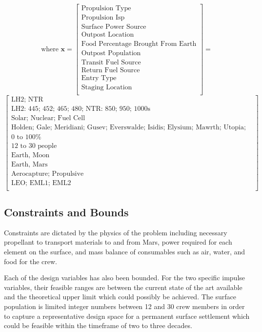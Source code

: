 \documentclass[]{aiaa-pretty}
\begin{document}
\begin{equation*}
\mbox{where } \mathbf{x}
=
\begin{bmatrix}
\mbox{Propulsion Type}\\
\mbox{Propulsion Isp}\\
\mbox{Surface Power Source}\\
\mbox{Outpost Location}\\
\mbox{Food Percentage Brought From Earth}\\
\mbox{Outpost Population}\\
\mbox{Transit Fuel Source}\\
\mbox{Return Fuel Source}\\
\mbox{Entry Type}\\
\mbox{Staging Location}\\
\end{bmatrix}
=
\end{equation*}
\begin{equation*}
\begin{bmatrix}
\mbox{LH2; NTR}\\
\mbox{LH2: 445; 452; 465; 480; NTR: 850; 950; 1000s}\\
\mbox{Solar; Nuclear; Fuel Cell}\\
\mbox{Holden; Gale; Meridiani; Gusev; Everswalde; Isidis; Elysium; Mawrth; Utopia; Planus Boreum; Hellas; Amazonis}\\
\mbox{0 to 100\%}\\
\mbox{12 to 30 people}\\
\mbox{Earth, Moon}\\
\mbox{Earth, Mars}\\
\mbox{Aerocapture; Propulsive}\\
\mbox{LEO; EML1; EML2}\\
\end{bmatrix}
\end{equation*}

\subsection{Constraints and Bounds}
\label{sec:constraints}
Constraints are dictated by the physics of the problem including necessary propellant to transport materials to and from Mars, power required for each element on the surface, and mass balance of consumables such as air, water, and food for the crew. 

Each of the design variables has also been bounded. For the two specific impulse variables, their feasible ranges are between the current state of the art available and the theoretical upper limit which could possibly be achieved. The surface population is limited integer numbers between 12 and 30 crew members in order to capture a representative design space for a permanent surface settlement which could be feasible within the timeframe of two to three decades.
\end{document}
